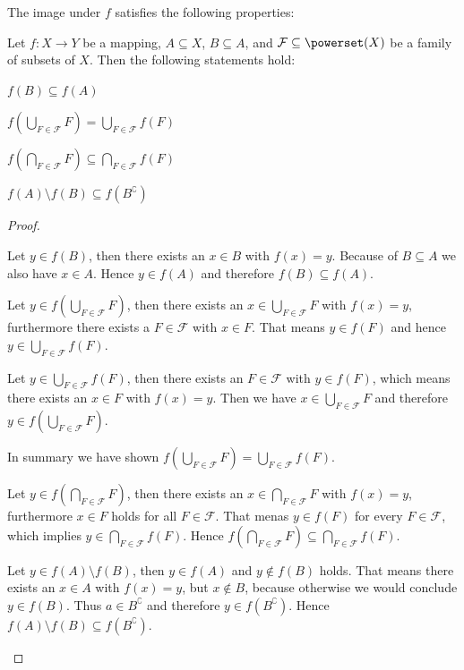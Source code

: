 The image under $f$ satisfies the following properties:
\begin{theorem}\label{theorem:mappings:image_properties}
    Let $f\colon X\rightarrow Y$ be a mapping, $A\subseteq X$, $B\subseteq A$, and $\mathcal F\subseteq\powerset(X)$ be a family of subsets of $X$. Then the following statements hold:
    \begin{intheoremenumerate}
        \item $f(B)\subseteq f(A)$
        \item $f(\bigcup_{F\in \mathcal F} F)=\bigcup_{F\in \mathcal F}f(F)$
        \item $f(\bigcap_{F\in \mathcal F} F)\subseteq \bigcap_{F\in\mathcal F}f(F)$
        \item $f(A)\setminus f(B)\subseteq f(B^\complement)$
    \end{intheoremenumerate}
\end{theorem}

\begin{proof}
    \begin{proofenumerate}
        \item Let $y\in f(B)$, then there exists an $x\in B$ with $f(x)=y$. Because of $B\subseteq A$ we also have $x\in A$. Hence $y\in f(A)$ and therefore $f(B)\subseteq f(A)$.
         
        \item \proofsubset Let $y\in f(\bigcup_{F\in\mathcal F}F)$, then there exists an $x\in\bigcup_{F\in\mathcal F}F$ with $f(x)=y$, furthermore there exists a $F\in\mathcal F$ with $x\in F$. That means $y\in f(F)$ and hence $y\in\bigcup_{F\in\mathcal F}f(F)$.
        
        \proofsupset Let $y\in\bigcup_{F\in\mathcal F}f(F)$, then there exists an $F\in\mathcal F$ with $y\in f(F)$, which means there exists an $x\in F$ with $f(x)=y$. Then we have $x\in\bigcup_{F\in\mathcal F}F$ and therefore $y\in f(\bigcup_{F\in\mathcal F}F)$.

        In summary we have shown $f(\bigcup_{F\in \mathcal F} F)=\bigcup_{F\in \mathcal F}f(F)$.

        \item Let $y\in f(\bigcap_{F\in\mathcal F}F)$, then there exists an $x\in\bigcap_{F\in\mathcal F}F$ with $f(x)=y$, furthermore $x\in F$ holds for all $F\in\mathcal F$. That menas $y\in f(F)$ for every $F\in\mathcal F$, which implies $y\in\bigcap_{F\in\mathcal F}f(F)$. Hence  $f(\bigcap_{F\in \mathcal F} F)\subseteq \bigcap_{F\in\mathcal F}f(F)$.
        
        \item Let $y\in f(A)\setminus f(B)$, then $y\in f(A)$ and $y\notin f(B)$ holds. That means there exists an $x\in A$ with $f(x)=y$, but $x\notin B$, because otherwise we would conclude $y\in f(B)$. Thus $a\in B^\complement$ and therefore $y\in f(B^\complement)$. Hence $f(A)\setminus f(B)\subseteq f(B^\complement)$.
    \end{proofenumerate}
\end{proof}


